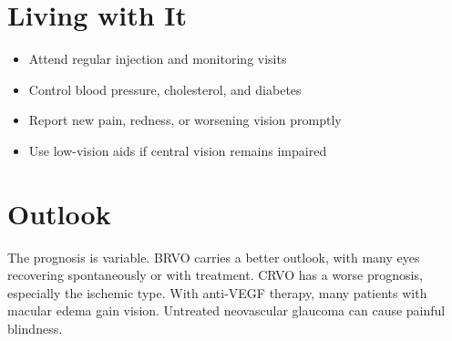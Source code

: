 \section{Living with It}
\begin{itemize}[noitemsep]
  \item Attend regular injection and monitoring visits
  \item Control blood pressure, cholesterol, and diabetes
  \item Report new pain, redness, or worsening vision promptly
  \item Use low-vision aids if central vision remains impaired
\end{itemize}
\section{Outlook}
The prognosis is variable. BRVO carries a better outlook, with many eyes recovering spontaneously or with treatment. CRVO has a worse prognosis, especially the ischemic type. With anti-VEGF therapy, many patients with macular edema gain vision. Untreated neovascular glaucoma can cause painful blindness.
